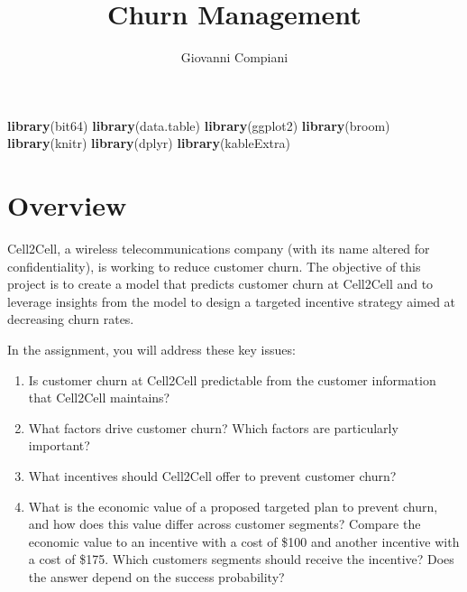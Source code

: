 \documentclass[
]{article}
\title{Churn Management}
\author{Giovanni Compiani}
\date{}
\newenvironment{Shaded}{\begin{snugshade}}{\end{snugshade}}
\newcommand{\FunctionTok}[1]{\textcolor[rgb]{0.13,0.29,0.53}{\textbf{#1}}}
\newcommand{\NormalTok}[1]{#1}
\begin{document}
\maketitle

{
\hypersetup{linkcolor=}
\setcounter{tocdepth}{2}
\tableofcontents
}
\setlength{\parskip}{6pt}
\newpage

\begin{Shaded}
\begin{Highlighting}[]
\FunctionTok{library}\NormalTok{(bit64)}
\FunctionTok{library}\NormalTok{(data.table)}
\FunctionTok{library}\NormalTok{(ggplot2)}
\FunctionTok{library}\NormalTok{(broom)}
\FunctionTok{library}\NormalTok{(knitr)}
\FunctionTok{library}\NormalTok{(dplyr)}
\FunctionTok{library}\NormalTok{(kableExtra)}
\end{Highlighting}
\end{Shaded}

\section{Overview}\label{overview}

Cell2Cell, a wireless telecommunications company (with its name altered
for confidentiality), is working to reduce customer churn. The objective
of this project is to create a model that predicts customer churn at
Cell2Cell and to leverage insights from the model to design a targeted
incentive strategy aimed at decreasing churn rates.

In the assignment, you will address these key issues:

\begin{enumerate}
\def\labelenumi{\arabic{enumi}.}
\item
  Is customer churn at Cell2Cell predictable from the customer
  information that Cell2Cell maintains?
\item
  What factors drive customer churn? Which factors are particularly
  important?
\item
  What incentives should Cell2Cell offer to prevent customer churn?
\item
  What is the economic value of a proposed targeted plan to prevent
  churn, and how does this value differ across customer segments?
  Compare the economic value to an incentive with a cost of \$100 and
  another incentive with a cost of \$175. Which customers segments
  should receive the incentive? Does the answer depend on the success
  probability?
\end{enumerate}
\end{document}
